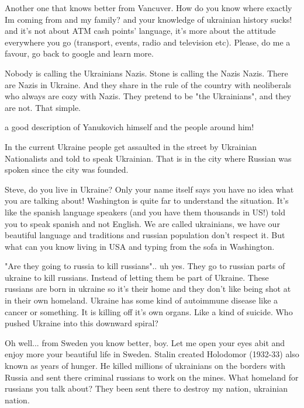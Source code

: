 \begin{itemize}
\begin{itemize}

Another one that knows better from Vancuver. How do you know where exactly Im
coming from and my family? and your knowledge of ukrainian history sucks! and
it's not about ATM cash points' language, it's more about the attitude
everywhere you go (transport, events, radio and television etc). Please, do me
a favour, go back to google and learn more.


Nobody is calling the Ukrainians Nazis. Stone is calling the Nazis Nazis. There
are Nazis in Ukraine. And they share in the rule of the country with
neoliberals who always are cozy with Nazis. They pretend to be "the
Ukrainians", and they are not. That simple.


a good description of Yanukovich himself and the people around him!


In the current Ukraine people get assaulted in the street by Ukrainian
Nationalists and told to speak Ukrainian. That is in the city where Russian was
spoken since the city was founded.


Steve, do you live in Ukraine? Only your name itself says you have no idea what
you are talking about! Washington is quite far to understand the situation.
It's like the spanish language speakers (and you have them thousands in US!)
told you to speak spanish and not English. We are called ukrainians, we have
our beautiful language and traditions and russian population don't respect it.
But what can you know living in USA and typing from the sofa in Washington.


"Are they going to russia to kill russians".. uh yes. They go to russian parts
of ukraine to kill russians. Instead of letting them be part of Ukraine. These
russians are born in ukraine so it's their home and they don't like being shot
at in their own homeland. Ukraine has some kind of autoimmune disease like a
cancer or something. It is killing off it's own organs. Like a kind of suicide.
Who pushed Ukraine into this downward spiral?


Oh well... from Sweden you know better, boy. Let me open your eyes abit and
enjoy more your beautiful life in Sweden. Stalin created Holodomor (1932-33)
also known as years of hunger. He killed millions of ukrainians on the borders
with Russia and sent there criminal russians to work on the mines. What
homeland for russians you talk about? They been sent there to destroy my
nation, ukrainian nation.


\end{itemize}
\end{itemize}
